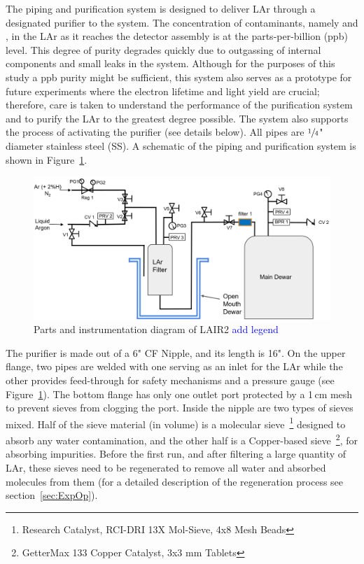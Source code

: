 \documentclass[a4paper,12pt]{article}
\newcommand{\RI}[1]{\textcolor{blue}{#1}}
\begin{document}
The piping and purification system is designed to deliver LAr through a designated purifier to the system. The concentration of contaminants, namely  and , in the LAr as it reaches the detector assembly is at the parts-per-billion (ppb) level. This degree of purity degrades quickly due to outgassing of internal components and small leaks in the system. Although for the purposes of this study a ppb purity might be sufficient, this system also serves as a prototype for future experiments where the electron lifetime and light yield are crucial; therefore, care is taken to understand the performance of the purification system and to purify the LAr to the greatest degree possible. The system also supports the process of activating the purifier (see details below). All pipes are $\sfrac{1}{4}$" diameter stainless steel (SS). A schematic of the piping and purification system is shown in Figure~\ref{fig:pnid}.
\begin{figure}[ht]
\centerline{\includegraphics[width=0.95\linewidth]{P&ID_paper.png}}

\caption{Parts and instrumentation diagram of LAIR2 \RI{add legend}}
\label{fig:pnid}
\end{figure}

The purifier is made out of a 6" CF Nipple, and its length is 16".  On the upper flange, two pipes are welded with one serving as an inlet for the LAr while the other provides feed-through for safety mechanisms and a pressure gauge (see Figure~\ref{fig:pnid}).  The bottom flange has only one outlet port protected by a 1\,cm mesh to prevent sieves from clogging the port. Inside the nipple are two types of sieves mixed. Half of the sieve material (in volume) is a molecular sieve~\footnote{Research Catalyst, RCI-DRI 13X Mol-Sieve, 4x8 Mesh Beads} designed to absorb any water contamination, and the other half is a Copper-based sieve~\footnote{GetterMax 133 Copper Catalyst, 3x3 mm Tablets}, for absorbing  impurities. Before the first run, and after filtering a large quantity of LAr, these sieves need to be regenerated to remove all water and absorbed  molecules from them (for a detailed description of the regeneration process see section~\ref{sec:ExpOp}). 
\end{document}
